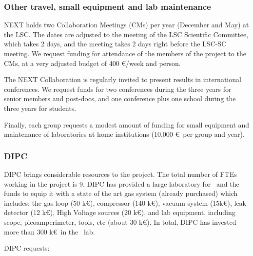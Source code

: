 \subsubsection{Other travel, small equipment and lab maintenance}
\label{sec:othercosts}

NEXT holds two Collaboration Meetings (CMs) per year (December and May) at the LSC. The dates are adjusted to the meeting of the LSC Scientific Committee, which takes 2 days, and the meeting takes 2 days right before the LSC-SC meeting. We request funding for attendance of the members of the project to the CMs, at a very adjusted budget of 400 \euro/week and person.

The NEXT Collaboration is regularly invited to present results in international conferences. We request funds for two conferences during the three years for senior members and post-docs, and one conference plus one school during the three years for students.

Finally, each group requests a modest amount of funding for small equipment and maintenance of laboratories at home institutions (10,000 \euro\ per group and year). 


\subsubsection{DIPC}

DIPC brings considerable resources to the project. The total number of FTEs working in the project is 9. DIPC has provided a large laboratory for \HDEMO\ and the funds to equip it with a state of the art gas system (already purchased) which includes: the gas loop (50 k\euro), compressor (140 k\euro),
vacuum system (15k\euro), leak detector (12 k\euro), High Voltage sources (20 k\euro), and lab equipment, including scope, picoamperimeter, tools, etc 
(about 30 k\euro). In total, DIPC has invested more than 300 k\euro\ in the \HDEMO\ lab. 
 
DIPC requests:


